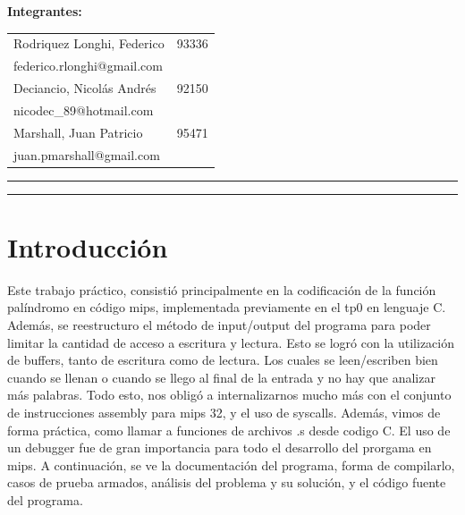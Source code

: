 \documentclass[11pt,a4paper]{article}
\newcommand\blankpage{%
	\null
	\thispagestyle{empty}%
	\addtocounter{page}{-1}%
	\newpage}
\begin{document}
\begin{titlepage}
	\begin{flushleft}
	\begin{table}[H]
		\begin{flushleft}
		\textbf{Integrantes:}\\
		\vspace{0.01\textheight}
		\begin{tabular}{l r}
			Rodriquez Longhi, Federico  & 93336\\
			\hspace{0.05\textheight}federico.rlonghi@gmail.com&\\
			Deciancio, Nicolás Andrés   & 92150\\
			\hspace{0.05\textheight}nicodec\_89@hotmail.com&\\
			Marshall, Juan Patricio & 95471\\
			\hspace{0.05\textheight}juan.pmarshall@gmail.com&\\
		\end{tabular}
		\end{flushleft}
	\end{table}
		

	\end{flushleft}
	\vspace{0.05\textheight}
	\vspace{2pt}
	\vfill
	\rule{\textwidth}{1pt}\par %
	\vspace{2pt}\vspace{-\baselineskip} %
	\rule{\textwidth}{0.4pt}\par %
	
\end{titlepage}

\blankpage

\tableofcontents

\newpage

\section{Introducción}
Este trabajo práctico, consistió principalmente en la codificación de la función palíndromo en código mips, implementada previamente en el tp0 en lenguaje C. Además, se reestructuro el método de input/output del programa para poder limitar la cantidad de acceso a escritura y lectura. Esto se logró con la utilización de buffers, tanto de escritura como de lectura. Los cuales se leen/escriben bien cuando se llenan o cuando se llego al final de la entrada y no hay que analizar más palabras.  
Todo esto, nos obligó a internalizarnos mucho más con el conjunto de instrucciones assembly para mips 32, y el uso de syscalls. Además, vimos de forma práctica, como llamar a funciones de archivos .s desde codigo C. El uso de un debugger fue de gran importancia para todo el desarrollo del prorgama en mips.
A continuación, se ve la documentación del programa, forma de compilarlo, casos de prueba armados, análisis del problema y su solución, y el código fuente del programa.
 
\end{document}
